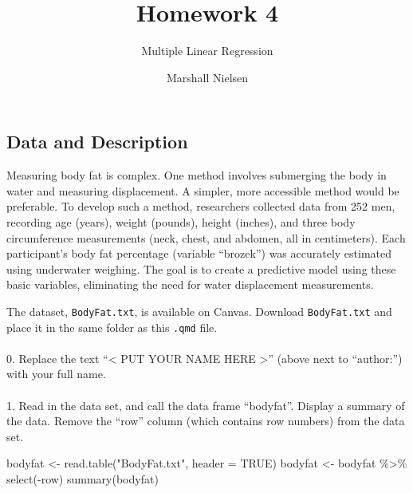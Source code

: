 \documentclass[
  letterpaper,
  DIV=11,
  numbers=noendperiod]{scrartcl}
\title{Homework 4}
\subtitle{Multiple Linear Regression}
\author{Marshall Nielsen}
\date{}
\makeatletter
\let\oldparagraph\paragraph
\renewcommand{\paragraph}{
    \@ifstar
      \xxxParagraphStar
      \xxxParagraphNoStar
  }
\newcommand{\xxxParagraphStar}[1]{\oldparagraph*{#1}\mbox{}}
\newcommand{\xxxParagraphNoStar}[1]{\oldparagraph{#1}\mbox{}}
\newenvironment{Shaded}{\begin{snugshade}}{\end{snugshade}}
\newcommand{\AttributeTok}[1]{\textcolor[rgb]{0.40,0.45,0.13}{#1}}
\newcommand{\ConstantTok}[1]{\textcolor[rgb]{0.56,0.35,0.01}{#1}}
\newcommand{\FunctionTok}[1]{\textcolor[rgb]{0.28,0.35,0.67}{#1}}
\newcommand{\NormalTok}[1]{\textcolor[rgb]{0.00,0.23,0.31}{#1}}
\newcommand{\OtherTok}[1]{\textcolor[rgb]{0.00,0.23,0.31}{#1}}
\newcommand{\SpecialCharTok}[1]{\textcolor[rgb]{0.37,0.37,0.37}{#1}}
\newcommand{\StringTok}[1]{\textcolor[rgb]{0.13,0.47,0.30}{#1}}
\makeatother
\begin{document}
\maketitle


\subsection{Data and Description}\label{data-and-description}

Measuring body fat is complex. One method involves submerging the body
in water and measuring displacement. A simpler, more accessible method
would be preferable. To develop such a method, researchers collected
data from 252 men, recording age (years), weight (pounds), height
(inches), and three body circumference measurements (neck, chest, and
abdomen, all in centimeters). Each participant's body fat percentage
(variable ``brozek'') was accurately estimated using underwater
weighing. The goal is to create a predictive model using these basic
variables, eliminating the need for water displacement measurements.

The dataset, \texttt{BodyFat.txt}, is available on Canvas. Download
\texttt{BodyFat.txt} and place it in the same folder as this
\texttt{.qmd} file.

\paragraph{\texorpdfstring{0. Replace the text ``\textless{} PUT YOUR
NAME HERE \textgreater{}'' (above next to ``author:'') with your full
name.}{0. Replace the text ``\textless{} PUT YOUR NAME HERE \textgreater'' (above next to ``author:'') with your full name.}}\label{replace-the-text-put-your-name-here-above-next-to-author-with-your-full-name.}

\paragraph{1. Read in the data set, and call the data frame ``bodyfat''.
Display a summary of the data. Remove the ``row'' column (which contains
row numbers) from the data
set.}\label{read-in-the-data-set-and-call-the-data-frame-bodyfat.-display-a-summary-of-the-data.-remove-the-row-column-which-contains-row-numbers-from-the-data-set.}

\begin{Shaded}
\begin{Highlighting}[]
\NormalTok{bodyfat }\OtherTok{\textless{}{-}} \FunctionTok{read.table}\NormalTok{(}\StringTok{"BodyFat.txt"}\NormalTok{, }\AttributeTok{header =} \ConstantTok{TRUE}\NormalTok{)}
\NormalTok{bodyfat }\OtherTok{\textless{}{-}}\NormalTok{ bodyfat }\SpecialCharTok{\%\textgreater{}\%} \FunctionTok{select}\NormalTok{(}\SpecialCharTok{{-}}\NormalTok{row)}
\FunctionTok{summary}\NormalTok{(bodyfat)}
\end{Highlighting}
\end{Shaded}
\end{document}
